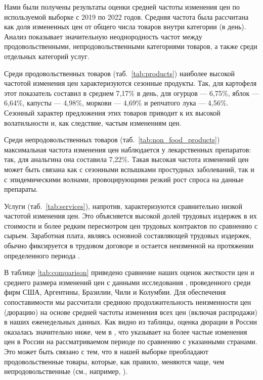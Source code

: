 Нами были получены результаты оценки средней частоты изменения цен по используемой выборке с 2019 по 2022 годов. Средняя частота была рассчитана как доля измененных цен от общего числа товаров внутри категории (в день). Анализ показывает значительную неоднородность частот между продовольственными, непродовольственными категориями товаров, а также среди отдельных категорий услуг. 

Среди продовольственных товаров (таб.~\ref{tab:products}) наиболее высокой частотой изменения цен характеризуются сезонные продукты. Так, для картофеля этот показатель составил в среднем 7,17\% в день, для огурцов — 6,75\%, яблок — 6,64\%, капусты — 4,98\%, моркови — 4,69\% и репчатого лука — 4,56\%. Сезонный характер предложения этих товаров приводит к их высокой волатильности и, как следствие, частым изменениям цен. 

Среди непродовольственных товаров (таб.~\ref{tab:non_food_products}) максимальная частота изменения цен наблюдается у лекарственных препаратов: так, для анальгина она составила 7,22\%. Такая высокая частота изменений цен может быть связана как с сезонными вспышками простудных заболеваний, так и с эпидемическими волнами, провоцирующими резкий рост спроса на данные препараты.

Услуги (таб.~\ref{tab:services}), напротив, характеризуются сравнительно низкой частотой изменения цен. Это объясняется высокой долей трудовых издержек в их стоимости и более редким пересмотром цен трудовых контрактов по сравнению с сырьем. Заработная плата, являясь основной составляющей трудовых издержек, обычно фиксируется в трудовом договоре и остается неизменной на протяжении определенного периода \cite{Vermeulen2012}.

В таблице \ref{tab:comparison} приведено сравнение наших оценок жесткости цен и среднего размера изменений цен с данными исследования \cite{cavallo2018scraped}, проведенного среди фирм США, Аргентины, Бразилии, Чили и Колумбии. Для обеспечения сопоставимости мы рассчитали среднюю продолжительность неизменности цен (дюрацию) на основе средней частоты изменения всех цен (включая распродажи) в наших еженедельных данных. Как видно из таблицы, оценка дюрации в России оказалась значительно ниже, чем в \cite{cavallo2018scraped}, что указывает на более частые изменения цен в России на рассматриваемом периоде по сравнению с указанными странами. Это может быть связано с тем, что в нашей выборке преобладают продовольственные товары, которые, как правило, меняются чаще, чем непродовольственные (см., например, \cite{bils2004some}).


